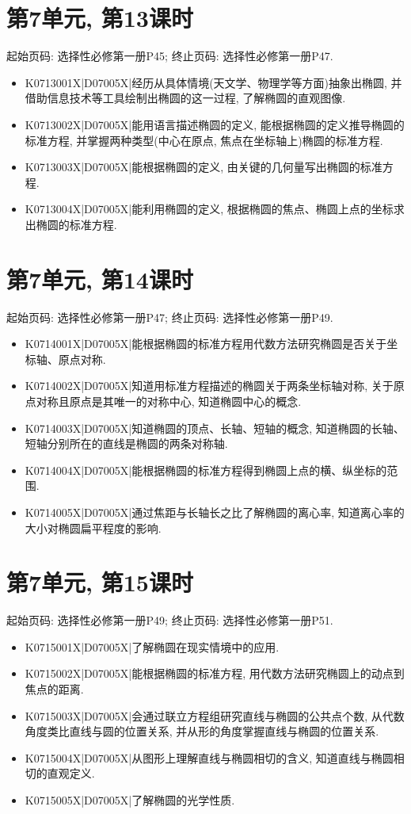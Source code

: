 \section*{第7单元, 第13课时}
起始页码: 选择性必修第一册P45; 终止页码: 选择性必修第一册P47.
\begin{itemize}
\item K0713001X|D07005X|经历从具体情境(天文学、物理学等方面)抽象出椭圆, 并借助信息技术等工具绘制出椭圆的这一过程, 了解椭圆的直观图像.
\item K0713002X|D07005X|能用语言描述椭圆的定义, 能根据椭圆的定义推导椭圆的标准方程, 并掌握两种类型(中心在原点, 焦点在坐标轴上)椭圆的标准方程.
\item K0713003X|D07005X|能根据椭圆的定义, 由关键的几何量写出椭圆的标准方程.
\item K0713004X|D07005X|能利用椭圆的定义, 根据椭圆的焦点、椭圆上点的坐标求出椭圆的标准方程.
\end{itemize}

\section*{第7单元, 第14课时}
起始页码: 选择性必修第一册P47; 终止页码: 选择性必修第一册P49.
\begin{itemize}
\item K0714001X|D07005X|能根据椭圆的标准方程用代数方法研究椭圆是否关于坐标轴、原点对称.
\item K0714002X|D07005X|知道用标准方程描述的椭圆关于两条坐标轴对称, 关于原点对称且原点是其唯一的对称中心, 知道椭圆中心的概念.
\item K0714003X|D07005X|知道椭圆的顶点、长轴、短轴的概念, 知道椭圆的长轴、短轴分别所在的直线是椭圆的两条对称轴.
\item K0714004X|D07005X|能根据椭圆的标准方程得到椭圆上点的横、纵坐标的范围.
\item K0714005X|D07005X|通过焦距与长轴长之比了解椭圆的离心率, 知道离心率的大小对椭圆扁平程度的影响.
\end{itemize}

\section*{第7单元, 第15课时}
起始页码: 选择性必修第一册P49; 终止页码: 选择性必修第一册P51.
\begin{itemize}
\item K0715001X|D07005X|了解椭圆在现实情境中的应用.
\item K0715002X|D07005X|能根据椭圆的标准方程, 用代数方法研究椭圆上的动点到焦点的距离.
\item K0715003X|D07005X|会通过联立方程组研究直线与椭圆的公共点个数, 从代数角度类比直线与圆的位置关系, 并从形的角度掌握直线与椭圆的位置关系.
\item K0715004X|D07005X|从图形上理解直线与椭圆相切的含义, 知道直线与椭圆相切的直观定义.
\item K0715005X|D07005X|了解椭圆的光学性质.
\end{itemize}

